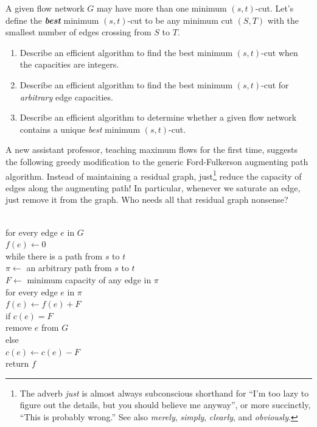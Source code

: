 \begin{exercises}
\item A given flow network $G$ may have more than one minimum $(s,t)$-cut.
Let’s define the \textbf{\textit{best}} minimum $(s,t)$-cut to be any minimum cut $(S,T)$ with the smallest number of edges crossing from $S$ to $T$.
\begin{enumerate}
\item Describe an efficient algorithm to find the best minimum $(s,t)$-cut when the capacities are integers.
\item Describe an efficient algorithm to find the best minimum $(s,t)$-cut for \textit{arbitrary} edge capacities.
\item Describe an efficient algorithm to determine whether a given flow network contains a unique \textit{best} minimum $(s,t)$-cut.
\end{enumerate}

\item A new assistant professor, teaching maximum flows for the first time, suggests the following greedy modification to the generic Ford-Fulkerson augmenting path algorithm.
Instead of maintaining a residual graph, just\footnote{The adverb \textit{just} is almost always subconscious shorthand for “I’m too lazy to figure out the details, but you should believe me anyway”, or more succinctly, “This is probably wrong.” See also \textit{merely}, \textit{simply}, \textit{clearly}, and \textit{obviously}.} reduce the capacity of edges along the augmenting path!
In particular, whenever we saturate an edge, just remove it from the graph.
Who needs all that residual graph nonsense?

\begin{pseudocode}
\\
for every edge $e$ in $G$\\
\Indent $f(e) \gets 0$\\
while there is a path from $s$ to $t$\\
\Indent $\pi \gets$ an arbitrary path from $s$ to $t$\\
\Indent $F \gets$ minimum capacity of any edge in $\pi$\\
\Indent for every edge $e$ in $\pi$\\
\Indent\Indent $f(e) \gets f(e) + F$\\
\Indent\Indent if $c(e) = F$\\
\Indent\Indent\Indent remove $e$ from $G$\\
\Indent\Indent else\\
\Indent\Indent\Indent $c(e) \gets c(e) - F$\\
return $f$
\end{pseudocode}


\end{exercises}
